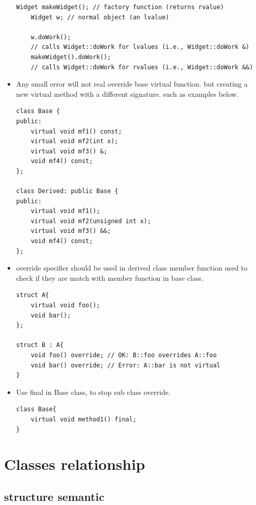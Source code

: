 \documentclass[a4paper,11pt,twoside]{book}
\begin{document}
\begin{itemize}
\begin{lstlisting}[numbers=none]
	Widget makeWidget(); // factory function (returns rvalue)
	Widget w; // normal object (an lvalue)
	
	w.doWork();
	// calls Widget::doWork for lvalues (i.e., Widget::doWork &)
	makeWidget().doWork();
	// calls Widget::doWork for rvalues (i.e., Widget::doWork &&)
\end{lstlisting}
	
\item Any small error will not real override base virtual function. but creating a new virtual method with a different signature. such as examples below.
\begin{lstlisting}[numbers=none]
class Base {
public:
	virtual void mf1() const;
	virtual void mf2(int x);
	virtual void mf3() &;
	void mf4() const;
};

class Derived: public Base {
public:
	virtual void mf1();
	virtual void mf2(unsigned int x);
	virtual void mf3() &&;
	void mf4() const;
};
\end{lstlisting}
	
	\item override specifier should be used in derived class member function used to check if they are match with member function in base class.
\begin{lstlisting}[numbers=none]
struct A{
	virtual void foo();
	void bar();
};
	
struct B : A{
	void foo() override; // OK: B::foo overrides A::foo
	void bar() override; // Error: A::bar is not virtual
}
	\end{lstlisting}
	
\item Use final in Base class, to stop sub class override.
\begin{lstlisting}[numbers=none]
class Base{
	virtual void method1() final;
}
\end{lstlisting}
	
\end{itemize}



\section{Classes relationship}

\subsection{structure semantic}
\end{document}
